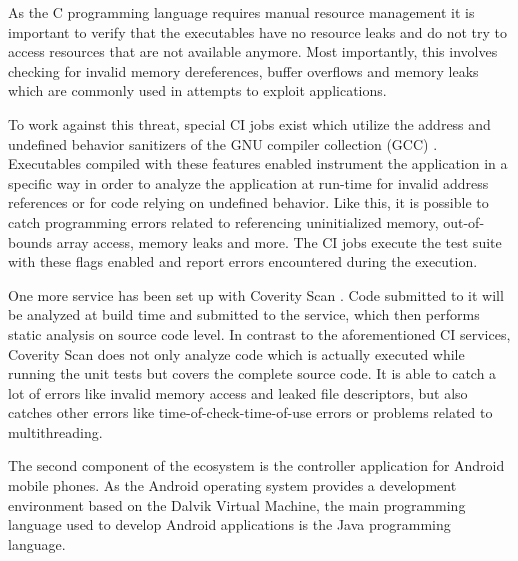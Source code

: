 As the C programming language requires manual resource management it is important to verify that the executables have no resource leaks and do not try to access resources that are not available anymore.
Most importantly, this involves checking for invalid memory dereferences, buffer overflows and memory leaks which are commonly used in attempts to exploit applications.

To work against this threat, special CI jobs exist which utilize the address and undefined behavior sanitizers of the GNU compiler collection (GCC) \cite{gcc}.
Executables compiled with these features enabled instrument the application in a specific way in order to analyze the application at run-time for invalid address references or for code relying on undefined behavior.
Like this, it is possible to catch programming errors related to referencing uninitialized memory, out-of-bounds array access, memory leaks and more.
The CI jobs execute the test suite with these flags enabled and report errors encountered during the execution.

One more service has been set up with Coverity Scan \cite{coverity}.
Code submitted to it will be analyzed at build time and submitted to the service, which then performs static analysis on source code level.
In contrast to the aforementioned CI services, Coverity Scan does not only analyze code which is actually executed while running the unit tests but covers the complete source code.
It is able to catch a lot of errors like invalid memory access and leaked file descriptors, but also catches other errors like time-of-check-time-of-use errors or problems related to multithreading.

\bigskip

The second component of the ecosystem is the controller application for Android mobile phones.
As the Android operating system provides a development environment based on the Dalvik Virtual Machine, the main programming language used to develop Android applications is the Java programming language.

